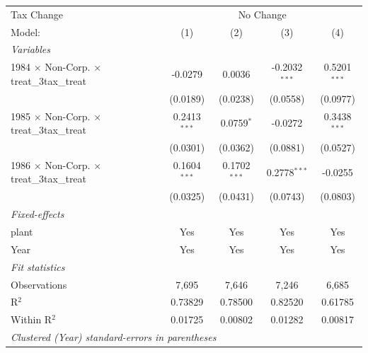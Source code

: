\documentclass[
  12pt]{article}
\theoremstyle{definition}
\theoremstyle{remark}
\begin{document}
\begin{table}
\begin{minipage}{\linewidth}
\begin{tabular}{lcccc}
   Tax Change & \multicolumn{4}{c}{No Change} \\ 
   Model:                                                  & (1)                    & (2)                  & (3)                 & (4)\\  
   \midrule
   \emph{Variables}\\
   1984 $\times$ Non-Corp. $\times$ treat\_3tax\_treat     & -0.0279                & 0.0036               & -0.2032$^{***}$     & 0.5201$^{***}$\\   
                                                           & (0.0189)               & (0.0238)             & (0.0558)            & (0.0977)\\   
   1985 $\times$ Non-Corp. $\times$ treat\_3tax\_treat     & 0.2413$^{***}$         & 0.0759$^{*}$         & -0.0272             & 0.3438$^{***}$\\   
                                                           & (0.0301)               & (0.0362)             & (0.0881)            & (0.0527)\\   
   1986 $\times$ Non-Corp. $\times$ treat\_3tax\_treat     & 0.1604$^{***}$         & 0.1702$^{***}$       & 0.2778$^{***}$      & -0.0255\\   
                                                           & (0.0325)               & (0.0431)             & (0.0743)            & (0.0803)\\   
   \midrule
   \emph{Fixed-effects}\\
   plant                                                   & Yes                    & Yes                  & Yes                 & Yes\\  
   Year                                                    & Yes                    & Yes                  & Yes                 & Yes\\  
   \midrule
   \emph{Fit statistics}\\
   Observations                                            & 7,695                  & 7,646                & 7,246               & 6,685\\  
   R$^2$                                                   & 0.73829                & 0.78500              & 0.82520             & 0.61785\\  
   Within R$^2$                                            & 0.01725                & 0.00802              & 0.01282             & 0.00817\\  
   \midrule \midrule
   \multicolumn{5}{l}{\emph{Clustered (Year) standard-errors in parentheses}}\\

\end{tabular}
\end{minipage}
\end{table}
\end{document}
